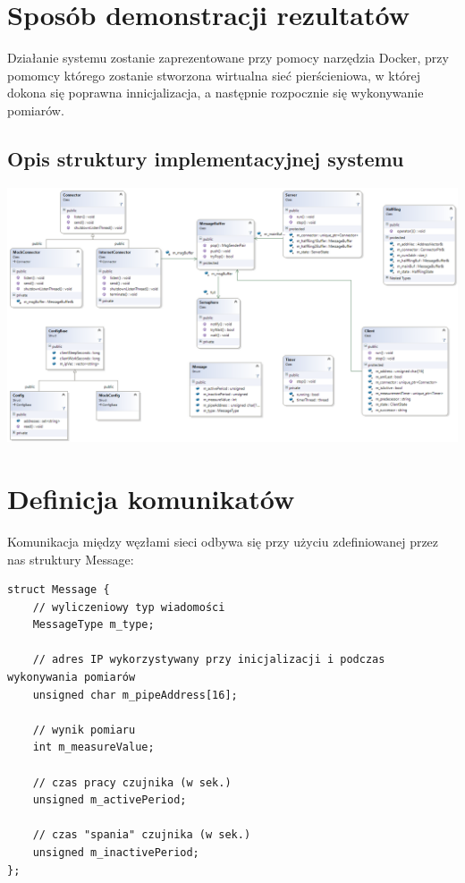 \documentclass[a4paper,11pt]{article}
\begin{document}
\section{Sposób demonstracji rezultatów}
Działanie systemu zostanie zaprezentowane przy pomocy narzędzia Docker,
przy pomomcy którego zostanie stworzona wirtualna sieć pierścieniowa, w której dokona się poprawna innicjalizacja, a następnie rozpocznie się wykonywanie pomiarów.


\begin{landscape}
  \pagestyle{empty}
  \section{Opis struktury implementacyjnej systemu}
  
\begin{center}
    \centerline{\includegraphics[width=1.4\textwidth]{class_diagram}}
\end{center}
\end{landscape}
\newpage

 
\section{Definicja komunikatów}
Komunikacja między węzłami sieci odbywa się przy użyciu zdefiniowanej przez nas
struktury Message:

\begin{verbatim}
struct Message {
    // wyliczeniowy typ wiadomości
    MessageType m_type; 				
    
    // adres IP wykorzystywany przy inicjalizacji i podczas wykonywania pomiarów
    unsigned char m_pipeAddress[16]; 	
    
    // wynik pomiaru
    int m_measureValue;
    
    // czas pracy czujnika (w sek.)			
    unsigned m_activePeriod;
    
    // czas "spania" czujnika (w sek.)	
    unsigned m_inactivePeriod; 			
};
\end{verbatim}
\end{document}
